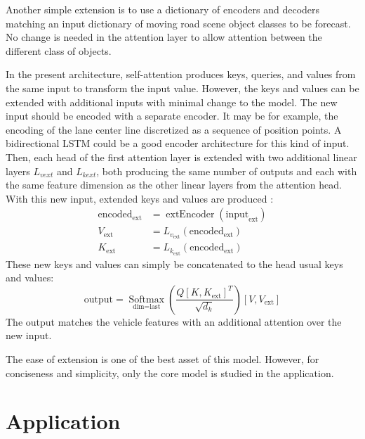 \documentclass[a4paper, 10pt, conference]{ieeeconf}      %
\begin{document}
Another simple extension is to use a dictionary of encoders and decoders matching an input dictionary of moving
road scene object classes to be forecast.
No change is needed in the attention layer to allow attention between the different class of objects.


In the present architecture, self-attention produces keys, queries, and values from the same input to transform the
input value.
However, the keys and values can be extended with additional inputs with minimal change to the model.
The new input should be encoded with a separate encoder.
It may be for example, the encoding of the lane center line discretized as a sequence of
position points.
A bidirectional LSTM could be a good encoder architecture for this kind of input.
Then, each head of the first attention layer is extended with two additional linear layers $L_{vext}$ and $L_{kext}$,
both producing the same number of outputs and each with the same feature dimension
as the other linear layers from the attention head.
With this new input, extended keys and values are produced :
\begin{equation}
    \begin{split}
        \text{encoded}_{\text{ext}} &= \operatorname{extEncoder}(\text{input}_{\text{ext}})\\
        V_{\text{ext}} &= L_{v_{\text{ext}}}(\text{encoded}_{\text{ext}})\\
        K_{\text{ext}} &= L_{k_{\text{ext}}}(\text{encoded}_{\text{ext}})
    \end{split}
\end{equation}
These new keys and values can simply be concatenated to the head usual keys and values:
\begin{equation}
    \text{output}=\underset{\text{dim}=\text{last}}{\operatorname{Softmax}}\left(\frac{Q[K, K_{\text{ext}}]^T}{\sqrt{d_k}}\right)[V, V_{\text{ext}}]
    \label{eq_selfattention_extended}
\end{equation}
The output matches the vehicle features with an additional attention over the new input.


The ease of extension is one of the best asset of this model.
However, for conciseness and simplicity, only the core model is studied in the application.

\section{Application}
\end{document}

